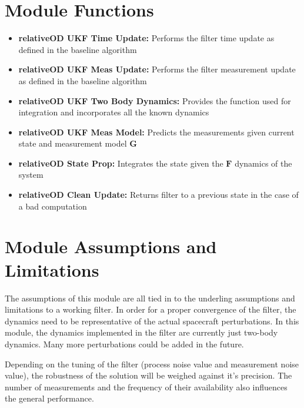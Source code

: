 

\section{Module Functions}

\begin{itemize}
    \item \textbf{relativeOD UKF Time Update: } Performs the filter time update as defined in the baseline algorithm
    \item \textbf{relativeOD UKF Meas Update: } Performs the filter measurement update as defined in the baseline algorithm
    \item \textbf{relativeOD UKF Two Body Dynamics: } Provides the function used for integration and incorporates all the known dynamics
    \item \textbf{relativeOD UKF Meas Model: } Predicts the measurements given current state and measurement model $\bm G$
    \item \textbf{relativeOD State Prop: } Integrates the state given the $\bm F$ dynamics of the system
    \item \textbf{relativeOD Clean Update: } Returns filter to a previous state in the case of a bad computation
    \end{itemize}

\section{Module Assumptions and Limitations}

The assumptions of this module are all tied in to the underling assumptions and limitations to a working filter. 
In order for a proper convergence of the filter, the dynamics need to be representative of the actual spacecraft perturbations. In this module, the dynamics implemented in the filter are currently just two-body dynamics. Many more perturbations could be added in the future. 

Depending on the tuning of the filter (process noise value and measurement noise value), the robustness of the solution will be weighed against it's precision. 
The number of measurements and the frequency of their availability also influences the general performance. 

